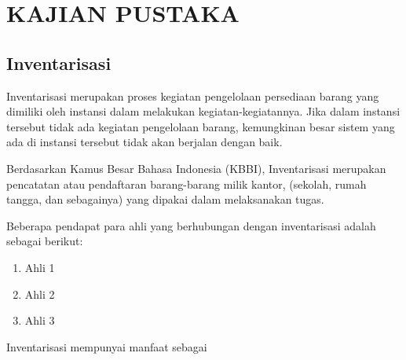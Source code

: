 
\chapter{KAJIAN PUSTAKA} 

\section{Inventarisasi}

Inventarisasi merupakan proses kegiatan pengelolaan persediaan barang yang dimiliki oleh instansi dalam melakukan kegiatan-kegiatannya. Jika dalam instansi tersebut tidak ada kegiatan pengelolaan barang, kemungkinan besar sistem yang ada di instansi tersebut tidak akan berjalan dengan baik.

Berdasarkan Kamus Besar Bahasa Indonesia (KBBI), Inventarisasi merupakan pencatatan atau pendaftaran barang-barang milik kantor, (sekolah, rumah tangga, dan sebagainya) yang dipakai dalam melaksanakan tugas.

Beberapa pendapat para ahli yang berhubungan dengan inventarisasi adalah sebagai berikut:
\begin{enumerate}
	\item Ahli 1
	\item Ahli 2
	\item Ahli 3
\end{enumerate}

Inventarisasi mempunyai manfaat sebagai 

